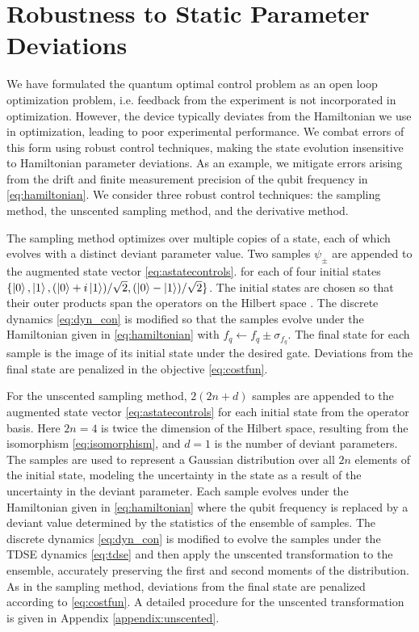 \section{Robustness to Static Parameter Deviations \label{sec:static}}
We have formulated the quantum optimal control
problem as an open loop optimization problem, i.e.
feedback from the experiment is not incorporated in optimization.
However, the device typically deviates from the Hamiltonian we use in optimization,
leading to poor experimental performance. We combat errors
of this form using robust control techniques,
making the state evolution insensitive
to Hamiltonian parameter deviations. As an example,
we mitigate errors arising from the drift and finite measurement
precision of the qubit frequency in \eqref{eq:hamiltonian}.
We consider three robust control techniques:
the sampling method, the unscented sampling method,
and the derivative method.

The sampling method optimizes over multiple copies of a state,
each of which evolves with a distinct deviant parameter value.
Two samples $\psi_{\pm}$
are appended to the augmented state vector \eqref{eq:astatecontrols}.
for each of four initial states
$\{\ket{0}, \ket{1}, (\ket{0} + i\ket{1}) / \sqrt{2},
(\ket{0} - \ket{1}) / \sqrt{2}\}$. The initial states are chosen
so that their outer products span the operators on the
Hilbert space  \cite{chow2009randomized}.
The discrete dynamics \eqref{eq:dyn_con} is modified so that the
samples evolve under the Hamiltonian given in \eqref{eq:hamiltonian}
with $f_{q} \gets f_{q} \pm \sigma_{f_{q}}$. The final state
for each sample is the image of its initial state
under the desired gate. Deviations from the final state are
penalized in the objective \eqref{eq:costfun}.

For the unscented sampling method, $2(2n + d)$ samples
are appended to the augmented state vector \eqref{eq:astatecontrols}
for each initial state from the operator basis. Here $2n = 4$ is twice the
dimension of the Hilbert space, resulting from the isomorphism \eqref{eq:isomorphism},
and $d = 1$ is the number of deviant parameters. The samples
are used to represent a Gaussian distribution over all $2n$
elements of the initial state, modeling
the uncertainty in the state as a result of the uncertainty in
the deviant parameter. Each sample evolves under the Hamiltonian given in
\eqref{eq:hamiltonian}
where the qubit frequency is replaced by a deviant value determined by the
statistics of the ensemble of samples.
The discrete dynamics \eqref{eq:dyn_con} is modified to 
evolve the samples under the TDSE dynamics \eqref{eq:tdse}
and then apply the unscented transformation to the ensemble,
accurately preserving the first and second moments
of the distribution.
As in the sampling method,
deviations from the final state are penalized according to \eqref{eq:costfun}.
A detailed procedure for the unscented transformation is given
in Appendix \ref{appendix:unscented}.

